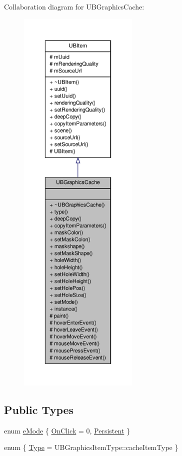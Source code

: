 Collaboration diagram for U\-B\-Graphics\-Cache\-:
\nopagebreak
\begin{figure}[H]
\begin{center}
\leavevmode
\includegraphics[height=550pt]{df/d44/class_u_b_graphics_cache__coll__graph}
\end{center}
\end{figure}
\subsection*{Public Types}
\begin{DoxyCompactItemize}
\item 
enum \hyperlink{class_u_b_graphics_cache_a960329a65b2dc045d3bf3c10511fb2aa}{e\-Mode} \{ \hyperlink{class_u_b_graphics_cache_a960329a65b2dc045d3bf3c10511fb2aaa83a35c452140f48acb380a78aa7a9423}{On\-Click} =  0, 
\hyperlink{class_u_b_graphics_cache_a960329a65b2dc045d3bf3c10511fb2aaa0a843dc02b203dc03d7e6199191ccdeb}{Persistent}
 \}
\item 
enum \{ \hyperlink{class_u_b_graphics_cache_a51142ffae19dd793b126d69433117edcae2a2971867d7c709556783d664814bbd}{Type} =  U\-B\-Graphics\-Item\-Type\-:\-:cache\-Item\-Type
 \}
\end{DoxyCompactItemize}
